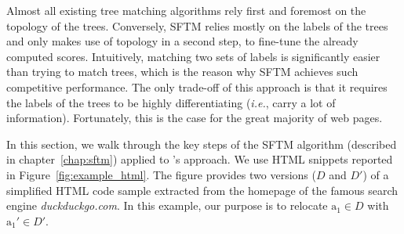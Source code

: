 Almost all existing tree matching algorithms rely first and foremost on the topology of the trees.
Conversely, SFTM relies mostly on the labels of the trees and only makes use of topology in a second step, to fine-tune the already computed scores. Intuitively, matching two sets of labels is significantly easier than trying to match trees, which is the reason why SFTM achieves such competitive performance.
The only trade-off of this approach is that it requires the labels of the trees to be highly differentiating (\emph{i.e.}, carry a lot of information). 
Fortunately, this is the case for the great majority of web pages.

In this section, we walk through the key steps of the SFTM algorithm (described in chapter~\ref{chap:sftm}) applied to \erratum{}'s approach. We use HTML snippets reported in Figure~\ref{fig:example_html}.
The figure provides two versions ($D$ and $D'$) of a simplified HTML code sample extracted from the homepage of the famous search engine \textit{duckduckgo.com}.
In this example, our purpose is to relocate $\text{a}_1 \in D$ with $\text{a}_1' \in D'$.

